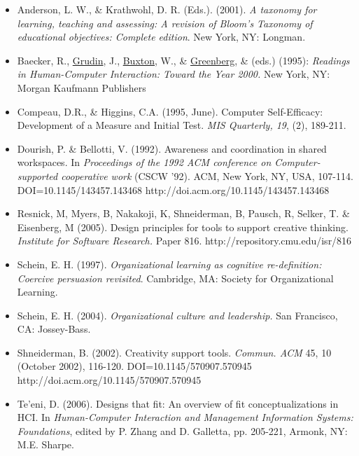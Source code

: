 \begin{itemize}
\item
  Anderson, L. W., \& Krathwohl, D. R. (Eds.). (2001). \emph{A taxonomy
  for learning, teaching and assessing: A revision of Bloom's Taxonomy
  of educational objectives: Complete edition}. New York, NY: Longman.
\item
  \href{http://www.interaction-design.org/references/authors/ronald\_m\_\_baecker.html}{}Baecker,
  R.,
  \href{http://www.interaction-design.org/references/authors/jonathan\_grudin.html}{Grudin},
  J.,
  \href{http://www.interaction-design.org/references/authors/william\_buxton.html}{Buxton},
  W., \&
  \href{http://www.interaction-design.org/references/authors/saul\_greenberg.html}{Greenberg},
  \& (eds.) (1995): \emph{Readings in Human-Computer Interaction: Toward
  the Year 2000.} New York, NY: Morgan Kaufmann Publishers
\item
  Compeau, D.R., \& Higgins, C.A. (1995, June). Computer Self-Efficacy:
  Development of a Measure and Initial Test. \emph{MIS Quarterly, 19},
  (2), 189-211.
\item
  Dourish, P. \& Bellotti, V. (1992). Awareness and coordination in
  shared workspaces. In \emph{Proceedings of the 1992 ACM conference on
  Computer-supported cooperative work} (CSCW '92). ACM, New York, NY,
  USA, 107-114. DOI=10.1145/143457.143468
  http://doi.acm.org/10.1145/143457.143468
\item
  Resnick, M, Myers, B, Nakakoji, K, Shneiderman, B, Pausch, R, Selker,
  T. \& Eisenberg, M (2005). Design principles for tools to support
  creative thinking. \emph{Institute for Software Research.} Paper 816.
  http://repository.cmu.edu/isr/816
\item
  Schein, E. H. (1997). \emph{Organizational learning as cognitive
  re-definition: Coercive persuasion revisited}. Cambridge, MA: Society
  for Organizational Learning.
\item
  Schein, E. H. (2004). \emph{Organizational culture and leadership.}
  San Francisco, CA: Jossey-Bass.
\item
  Shneiderman, B. (2002). Creativity support tools. \emph{Commun. ACM}
  45, 10 (October 2002), 116-120. DOI=10.1145/570907.570945
  http://doi.acm.org/10.1145/570907.570945
\item
  Te'eni, D. (2006). Designs that fit: An overview of fit
  conceptualizations in HCI. In \emph{Human-Computer Interaction and
  Management Information Systems: Foundations}, edited by P. Zhang and
  D. Galletta, pp. 205-221, Armonk, NY: M.E. Sharpe.
\end{itemize}
